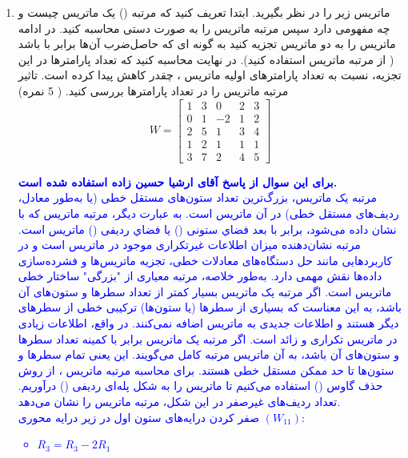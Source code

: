 \documentclass[12pt]{article}
\begin{document}
\begin{enumerate}
    \begin{enumerate}
            \item ماتریس  زیر را در نظر بگیرید. ابتدا تعریف کنید که مرتبه () یک ماتریس چیست و چه مفهومی دارد سپس مرتبه ماتریس  را به صورت دستی محاسبه کنید. در ادامه ماتریس  را به دو ماتریس تجزیه کنید به گونه ای که حاصل‌ضرب آن‌ها برابر با   باشد ( از مرتبه ماتریس استفاده کنید). در نهایت محاسبه کنید که تعداد پارامترها در این تجزیه، نسبت به تعداد پارامترهای اولیه ماتریس ، چقدر کاهش پیدا کرده است. تاثیر مرتبه ماتریس را در تعداد پارامترها بررسی کنید. ( 5 نمره) 
        $$
            W=\left[\begin{array}{ccccc}
            1 & 3 & 0 & 2 & 3 \\
            0 & 1 & -2 & 1 & 2 \\
            2 & 5 & 1 & 3 & 4 \\
            1 & 2 & 1 & 1 & 1 \\
            3 & 7 & 2 & 4 & 5
            \end{array}\right]
        $$
        \textcolor{blue}{
        \textbf{برای این سوال از پاسخ آقای ارشیا حسین زاده استفاده شده است.}\\
        مرتبه يک ماتريس، بزرگ‌ترين تعداد ستون‌های مستقل خطی (يا به‌طور معادل، رديف‌های مستقل خطی) در آن ماتريس است. به عبارت ديگر، مرتبه ماتريس  که با  نشان داده می‌شود، برابر با بعد فضاي ستونی () يا فضاي رديفی () ماتريس است. مرتبه نشان‌دهنده ميزان اطلاعات غيرتکراری موجود در ماتريس است و در کاربردهايی مانند حل دستگاه‌های معادلات خطی، تجزيه ماتريس‌ها و فشرده‌سازی داده‌ها نقش مهمی دارد. به‌طور خلاصه، مرتبه معياری از "بزرگی" ساختار خطی ماتريس است. اگر مرتبه یک ماتریس بسیار کمتر از تعداد سطرها و ستون‌های آن باشد، به این معناست که بسیاری از سطرها (یا ستون‌ها) ترکیبی خطی از سطرهای دیگر هستند و اطلاعات جدیدی به ماتریس اضافه نمی‌کنند. در واقع، اطلاعات زیادی در ماتریس تکراری و زائد است. اگر مرتبه یک ماتریس برابر با کمینه تعداد سطرها و ستون‌های آن باشد، به آن ماتریس مرتبه کامل می‌گویند. این یعنی تمام سطرها و ستون‌ها تا حد ممکن مستقل خطی هستند.
        برای محاسبه مرتبه ماتريس  ، از روش حذف گاوس () استفاده می‌کنيم تا ماتريس را به شکل پله‌ای رديفی () درآوريم. تعداد رديف‌های غيرصفر در اين شکل، مرتبه ماتريس را نشان می‌دهد.\\
        صفر کردن درایه‌های ستون اول در زیر درایه محوری $(W_{11})$:  
        \begin{itemize}
            \item $R_3 = R_3 - 2R_1$

\end{itemize}}
\end{enumerate}
\end{enumerate}
\end{document}
